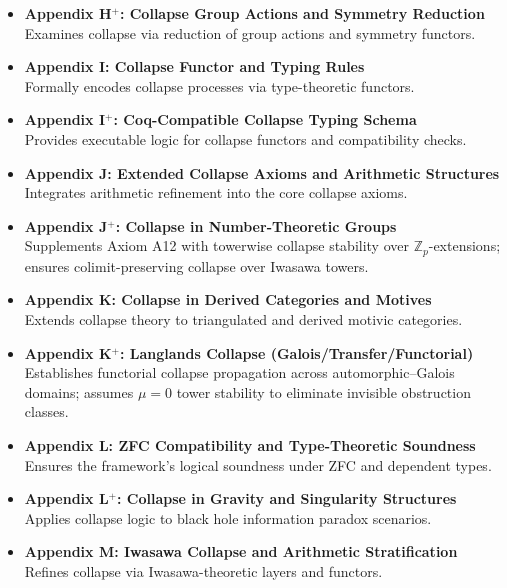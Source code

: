 \documentclass[11pt]{article}
\begin{document}
\begin{itemize}
  \item \textbf{Appendix H$^+$: Collapse Group Actions and Symmetry Reduction} \\
  Examines collapse via reduction of group actions and symmetry functors.

  \item \textbf{Appendix I: Collapse Functor and Typing Rules} \\
  Formally encodes collapse processes via type-theoretic functors.

  \item \textbf{Appendix I$^+$: Coq-Compatible Collapse Typing Schema} \\
  Provides executable logic for collapse functors and compatibility checks.

  \item \textbf{Appendix J: Extended Collapse Axioms and Arithmetic Structures} \\
  Integrates arithmetic refinement into the core collapse axioms.

   \item \textbf{Appendix J$^+$: Collapse in Number-Theoretic Groups} \\
  Supplements Axiom A12 with towerwise collapse stability over $\mathbb{Z}_p$-extensions; ensures colimit-preserving collapse over Iwasawa towers.

  \item \textbf{Appendix K: Collapse in Derived Categories and Motives} \\
  Extends collapse theory to triangulated and derived motivic categories.

  \item \textbf{Appendix K$^+$: Langlands Collapse (Galois/Transfer/Functorial)} \\
  Establishes functorial collapse propagation across automorphic–Galois domains; assumes $\mu = 0$ tower stability to eliminate invisible obstruction classes.

  \item \textbf{Appendix L: ZFC Compatibility and Type-Theoretic Soundness} \\
  Ensures the framework's logical soundness under ZFC and dependent types.

  \item \textbf{Appendix L$^+$: Collapse in Gravity and Singularity Structures} \\
  Applies collapse logic to black hole information paradox scenarios.

  \item \textbf{Appendix M: Iwasawa Collapse and Arithmetic Stratification} \\
  Refines collapse via Iwasawa-theoretic layers and functors.


\end{itemize}
\end{document}
